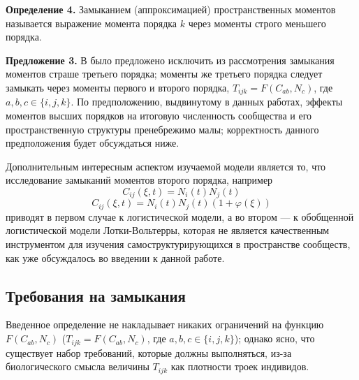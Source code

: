 \textbf{Определение 4.} Замыканием (аппроксимацией) пространственных моментов называется выражение момента порядка $k$ через моменты строго меньшего порядка.

\textbf{Предложение 3.} В \cite{law_dieckmann_2000,murlaw} было предложено исключить из рассмотрения замыкания моментов страше третьего порядка; моменты же третьего порядка следует замыкать через моменты первого и второго порядка, $ T_{ijk}=F(C_{ab},N_{c}) $, где $a, b, c \in \{i, j , k\}$. По предположению, выдвинутому в данных работах, эффекты моментов высших порядков на итоговую численность сообщества и его пространственную структуры пренебрежимо малы; корректность данного предположения будет обсуждаться ниже.

Дополнительным интересным аспектом изучаемой модели является то, что исследование замыканий моментов второго порядка, например
\begin{equation*}
C_{ij}(\xi,t)=N_{i}(t)N_{j}(t)
\end{equation*}
\begin{equation*}
C_{ij}(\xi,t)=N_{i}(t)N_{j}(t)(1+\varphi(\xi))
\end{equation*}
приводят в первом случае к логистической модели, а во втором --- к обобщенной логистической модели Лотки-Вольтерры, которая не является качественным инструментом для изучения самоструктурирующихся в пространстве сообществ, как уже обсуждалось во введении к данной работе.

\subsection{Требования на замыкания}

Введенное определение не накладывает никаких ограничений на функцию $F(C_{ab}, N_c)$ ($ T_{ijk}=F(C_{ab},N_c) $, где $a, b, c \in \{i, j , k\}$); однако ясно, что существует набор требований, которые должны выполняться, из-за биологического смысла величины $T_{ijk}$ как плотности троек индивидов. 

